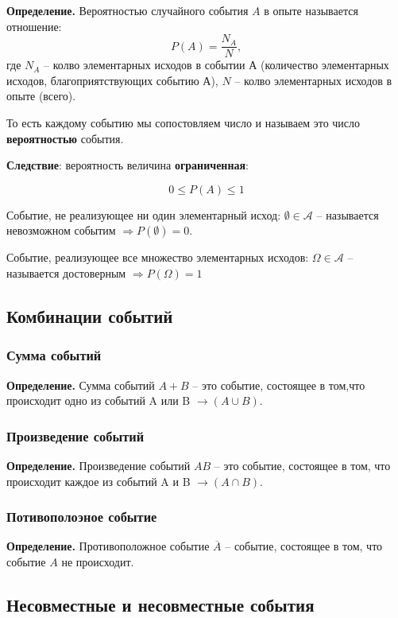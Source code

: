 \documentclass{article}
\begin{document}
\textbf{Определение.} Вероятностью случайного события $A$ в опыте называется отношение:
$$ P(A) = \frac{N_A}{N},$$
где $N_A$ -- колво элементарных исходов в событии А (количество элементарных исходов, благоприятствующих событию А),
$N$ -- колво элементарных исходов в опыте (всего).

То есть каждому событию мы сопостовляем число и называем это число \textbf{вероятностью} события.

\textbf{Следствие}: вероятность величина \textbf{ограниченная}:

$$ 0 \leq P(A) \leq 1 $$

\quad

Событие, не реализующее ни один элементарный исход: $\emptyset \in \mathcal{A} $ -- называется невозможном событим $\Rightarrow P(\emptyset) = 0$.

Событие, реализующее все множество элементарных исходов: $\Omega \in \mathcal{A}  $ -- называется достоверным $\Rightarrow P(\Omega) = 1$

\subsection{Комбинации событий}
\subsubsection{Сумма событий}

\textbf{Определение.} Сумма событий $ A + B $ -- это событие, состоящее в том,что происходит одно из событий A или B $\rightarrow (A\cup B) $.
\subsubsection{Произведение событий}

\textbf{Определение.} Произведение событий $AB$ -- это событие, состоящее в том, что происходит каждое из событий A и B $\rightarrow(A\cap B)$.

\subsubsection{Потивополоэное событие}

\textbf{Определение.} Противоположное событие $\overline A$ -- событие, состоящее в том, что событие $A$ не происходит.

\subsection{Несовместные и несовместные события}
\end{document}
